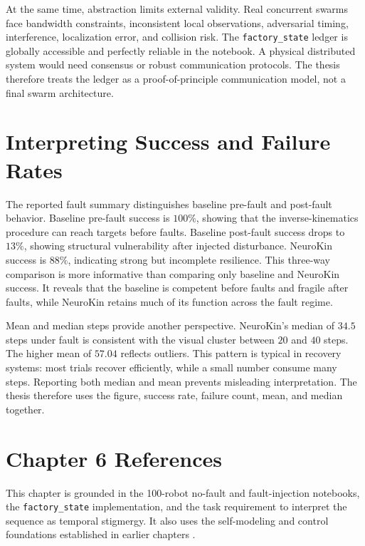 \documentclass[12pt,a4paper,oneside]{report}
\begin{document}
At the same time, abstraction limits external validity. Real concurrent swarms face bandwidth constraints, inconsistent local observations, adversarial timing, interference, localization error, and collision risk. The \texttt{factory\_state} ledger is globally accessible and perfectly reliable in the notebook. A physical distributed system would need consensus or robust communication protocols. The thesis therefore treats the ledger as a proof-of-principle communication model, not a final swarm architecture.

\section{Interpreting Success and Failure Rates}

The reported fault summary distinguishes baseline pre-fault and post-fault behavior. Baseline pre-fault success is $100\%$, showing that the inverse-kinematics procedure can reach targets before faults. Baseline post-fault success drops to $13\%$, showing structural vulnerability after injected disturbance. NeuroKin success is $88\%$, indicating strong but incomplete resilience. This three-way comparison is more informative than comparing only baseline and NeuroKin success. It reveals that the baseline is competent before faults and fragile after faults, while NeuroKin retains much of its function across the fault regime.

Mean and median steps provide another perspective. NeuroKin's median of $34.5$ steps under fault is consistent with the visual cluster between $20$ and $40$ steps. The higher mean of $57.04$ reflects outliers. This pattern is typical in recovery systems: most trials recover efficiently, while a small number consume many steps. Reporting both median and mean prevents misleading interpretation. The thesis therefore uses the figure, success rate, failure count, mean, and median together.

\section*{Chapter 6 References}

This chapter is grounded in the 100-robot no-fault and fault-injection notebooks, the \texttt{factory\_state} implementation, and the task requirement to interpret the sequence as temporal stigmergy. It also uses the self-modeling and control foundations established in earlier chapters \cite{bongard2006resilient,cully2015robots,kwiatkowski2019task}.
\end{document}
